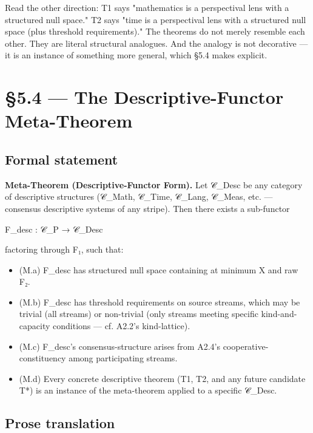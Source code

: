 \documentclass[11pt, openany]{book}
\newcommand{\sectionbreak}{\clearpage}
\begin{document}
Read the other direction: T1 says "mathematics is a perspectival lens with a structured null space." T2 says "time is a perspectival lens with a structured null space (plus threshold requirements)." The theorems do not merely resemble each other. They are literal structural analogues. And the analogy is not decorative --- it is an instance of something more general, which §5.4 makes explicit.

\sectionbreak

\section{§5.4 --- The Descriptive-Functor Meta-Theorem}

\subsection{Formal statement}

\textbf{Meta-Theorem (Descriptive-Functor Form).} Let 𝒞\_\allowbreak{}Desc be any category of descriptive structures (𝒞\_\allowbreak{}Math, 𝒞\_\allowbreak{}Time, 𝒞\_\allowbreak{}Lang, 𝒞\_\allowbreak{}Meas, etc. --- consensus descriptive systems of any stripe). Then there exists a sub-functor

\begin{Code}
F_desc : 𝒞_P → 𝒞_Desc
\end{Code}

factoring through F₁, such that:

\begin{itemize}
\item (M.a) F\_\allowbreak{}desc has structured null space containing at minimum X and raw F₂.
\item (M.b) F\_\allowbreak{}desc has threshold requirements on source streams, which may be trivial (all streams) or non-trivial (only streams meeting specific kind-and-capacity conditions --- cf. A2.2's kind-lattice).
\item (M.c) F\_\allowbreak{}desc's consensus-structure arises from A2.4's cooperative-constituency among participating streams.
\item (M.d) Every concrete descriptive theorem (T1, T2, and any future candidate T*) is an instance of the meta-theorem applied to a specific 𝒞\_\allowbreak{}Desc.
\end{itemize}

\subsection{Prose translation}
\end{document}
